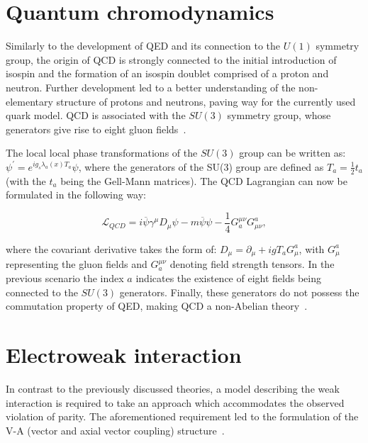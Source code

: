 \section{Quantum chromodynamics}
\hspace{10pt} Similarly to the development of QED and its connection to the $U(1)$ symmetry group, the origin of QCD is strongly connected to the initial introduction of isospin and the formation of an isospin doublet comprised of a proton and neutron. Further development led to a better understanding of the non-elementary structure of protons and neutrons, paving way for the currently used quark model. QCD is associated with the $SU(3)$ symmetry group, whose generators give rise to eight gluon fields~\cite{thomson_2013,book:schwartz, gell_mann}. %

\hspace{10pt} The local local phase transformations of the $SU(3)$ group can be written as: $\psi^{'} = e^{ig_{s}\lambda_a(x) T_a}\psi$, where the generators of the SU(3) group are defined as $T_a = \frac{1}{2}t_a$ (with the $t_a$ being the Gell-Mann matrices). The QCD Lagrangian can now be formulated in the following way:

\begin{equation}
    \mathcal{L}_{QCD} = i\overline{\psi}\gamma^{\mu}D_{\mu}\psi - m\overline{\psi}\psi - \frac{1}{4}G_{a}^{\mu\nu}G^{a}_{\mu\nu},
\end{equation}

where the covariant derivative takes the form of: $D_{\mu} = \partial_{\mu} + igT_aG^{a}_{\mu}$, with $G_{\mu}^a$ representing the gluon fields and  $G_a^{\mu\nu}$ denoting field strength tensors. In the previous scenario the index $a$ indicates the existence of eight fields being connected to the $SU(3)$ generators. Finally, these generators do not possess the commutation property of QED, making QCD a non-Abelian theory~\cite{book:guenther}.
\section{Electroweak interaction}
\label{sec:ew_unification}
\hspace{10pt} In contrast to the previously discussed theories, a model describing the weak interaction is required to take an approach which accommodates the observed violation of parity. The aforementioned requirement led to the formulation of the V-A (vector and axial vector coupling) structure~\cite{book:eliot}. 

